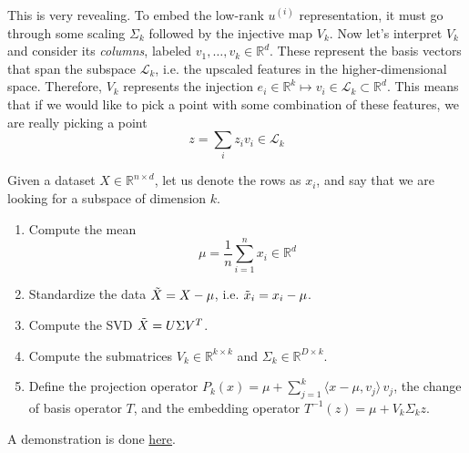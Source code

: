 \documentclass{article}
\begin{document}
  This is very revealing. To embed the low-rank $u^{(i)}$ representation, it must go through some scaling $\Sigma_k$ followed by the injective map $V_k$. Now let's interpret $V_k$ and consider its \textit{columns}, labeled $v_1, \ldots, v_k \in \mathbb{R}^d$. These represent the basis vectors that span the subspace $\mathcal{L}_k$, i.e. the upscaled features in the higher-dimensional space. Therefore, $V_k$ represents the injection $e_i \in \mathbb{R}^k \mapsto v_i \in \mathcal{L}_k \subset \mathbb{R}^d$. This means that if we would like to pick a point with some combination of these features, we are really picking a point 
  \begin{equation}
    z = \sum_i z_i v_i \in \mathcal{L}_k
  \end{equation}

  \begin{algo}[Fitting] 
    Given a dataset $X \in \mathbb{R}^{n \times d}$, let us denote the rows as $x_i$, and say that we are looking for a subspace of dimension $k$. 
    \begin{enumerate}
      \item Compute the mean 
      \begin{equation}
        \mu = \frac{1}{n} \sum_{i=1}^n x_i  \in \mathbb{R}^d
      \end{equation} 

      \item Standardize the data $\Tilde{X} = X - \mu$, i.e. $\Tilde{x}_i = x_i - \mu$.  

      \item Compute the SVD $\Tilde{X} = U \Sigma V^T$.

      \item Compute the submatrices $V_k \in \mathbb{R}^{k \times k}$ and $\Sigma_k \in \mathbb{R}^{D \times k}$. 

      \item Define the projection operator $P_k (x) = \mu + \sum_{j=1}^k \langle x - \mu, v_j \rangle \, v_j$, the change of basis operator $T$, and the embedding operator $T^{-1} (z) = \mu + V_k \Sigma_k z$. 
    \end{enumerate} 
    A demonstration is done \href{code/pca.html}{here}.
  \end{algo}
\end{document}

